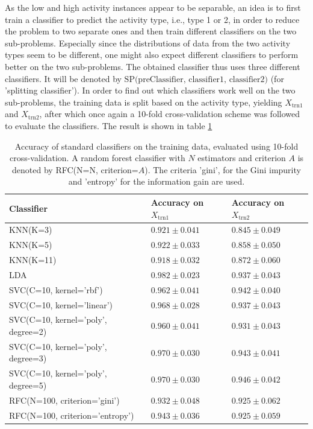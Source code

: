 \documentclass [a4paper] {report}
\begin{document}
	\noindent
	As the low and high activity instances appear to be separable, an idea is to first train a classifier to predict the activity type, i.e., type 1 or 2, in order to reduce the problem to two separate ones and then train different classifiers on the two sub-problems. Especially since the distributions of data from the two activity types seem to be different, one might also expect different classifiers to perform better on the two sub-problems. The obtained classifier thus uses three different classifiers. It will be denoted by $\text{SP(preClassifier, classifier1, classifier2})$ (for 'splitting classifier').
	In order to find out which classifiers work well on the two sub-problems, the training data is split based on the activity type, yielding $X_{\text{trn1}}$ and $X_{\text{trn2}}$, after which once again a 10-fold cross-validation scheme was followed to evaluate the classifiers. The result is shown in table \ref{tab:basic_separated}
	
	\begin{table}[H]
		\centering
		\caption{Accuracy of standard classifiers on the training data, evaluated using 10-fold cross-validation. A random forest classifier with $N$ estimators and criterion $A$ is denoted by RFC(N=N, criterion=$A$). The criteria 'gini', for the Gini impurity and 'entropy' for the information gain are used.}
		\label{tab:basic_separated}
		\begin{tabular}{l|l|l}
			Classifier 							& Accuracy on $X_{\text{trn1}}$ & Accuracy on $X_{\text{trn2}}$ \\ \hline
			KNN(K=3)						 	& $0.921 \pm 0.041 $			& $0.845 \pm 0.049 $\\
			KNN(K=5) 							& $0.922 \pm 0.033 $			& $0.858 \pm 0.050 $\\
			KNN(K=11) 							& $0.918 \pm 0.032 $			& $0.872 \pm 0.060 $\\
			LDA 								& $0.982 \pm 0.023 $			& $0.937 \pm 0.043 $\\
			SVC(C=10, kernel='rbf') 			& $0.962 \pm 0.041 $			& $0.942 \pm 0.040 $\\
			SVC(C=10, kernel='linear') 			& $0.968 \pm 0.028 $			& $0.937 \pm 0.043 $\\
			SVC(C=10, kernel='poly', degree=2) 	& $0.960 \pm 0.041 $			& $0.931 \pm 0.043 $\\
			SVC(C=10, kernel='poly', degree=3) 	& $0.970 \pm 0.030 $			& $0.943 \pm 0.041 $\\
			SVC(C=10, kernel='poly', degree=5) 	& $0.970 \pm 0.030 $			& $0.946 \pm 0.042 $\\
			RFC(N=100, criterion='gini')		& $0.932 \pm 0.048 $			& $0.925 \pm 0.062 $\\
			RFC(N=100, criterion='entropy')		& $0.943 \pm 0.036 $			& $0.925 \pm 0.059 $\\
		\end{tabular}		
	\end{table}
	
\end{document}
